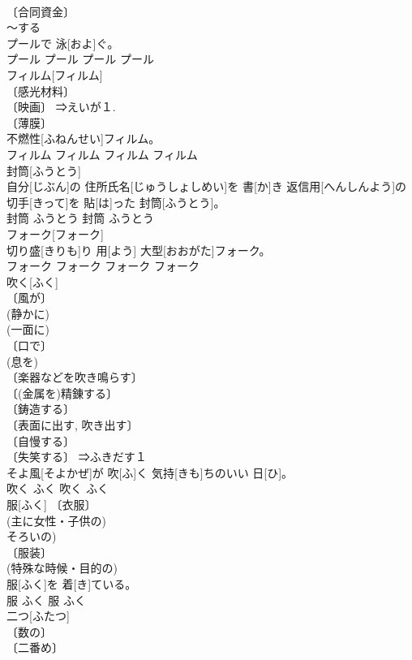 \documentclass[8pt]{extreport}
\begin{document}
\begin{CJK}{UTF8}{min}
\\	〔合同資金〕 
\\	～する 
\\	プールで 泳[およ]ぐ。	
\\	プール	プール	プール	プール	
\\	フィルム[フィルム]	
\\	〔感光材料〕 
\\	〔映画〕 ⇒えいが１. 
\\	〔薄膜〕 
\\	不燃性[ふねんせい]フィルム。	
\\	フィルム	フィルム	フィルム	フィルム	
\\	封筒[ふうとう]	
\\	自分[じぶん]の 住所氏名[じゅうしょしめい]を 書[か]き 返信用[へんしんよう]の 切手[きって]を 貼[は]った 封筒[ふうとう]。	
\\	封筒	ふうとう	封筒	ふうとう	
\\	フォーク[フォーク]	
\\	切り盛[きりも]り 用[よう] 大型[おおがた]フォーク。	
\\	フォーク	フォーク	フォーク	フォーク	
\\	吹く[ふく]	
\\	〔風が〕 
\\	(静かに) 
\\	(一面に) 
\\	〔口で〕 
\\	(息を) 
\\	〔楽器などを吹き鳴らす〕 
\\	〔(金属を)精錬する〕 
\\	〔鋳造する〕 
\\	〔表面に出す, 吹き出す〕 
\\	〔自慢する〕 
\\	〔失笑する〕 ⇒ふきだす１ 
\\	そよ風[そよかぜ]が 吹[ふ]く 気持[きも]ちのいい 日[ひ]。	
\\	吹く	ふく	吹く	ふく	
\\	服[ふく]	〔衣服〕 
\\	(主に女性・子供の) 
\\	そろいの) 
\\	〔服装〕 
\\	(特殊な時候・目的の) 
\\	[⇒ようふく, きもの]	服[ふく]を 着[き]ている。	
\\	服	ふく	服	ふく	
\\	二つ[ふたつ]	
\\	〔数の〕 
\\	〔二番め〕 

\end{CJK}
\end{document}

